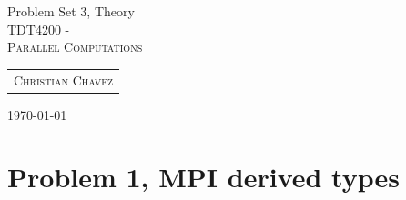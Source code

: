 \documentclass[fontsize=11pt, paper=a4, titlepage]{article}
\begin{document}
\begin{center}

{\huge Problem Set 3, Theory}\\[0.5cm]

\textsc{\LARGE TDT4200 -}\\[0.5cm]
\textsc{\large Parallel Computations}\\[1.0cm]

\begin{table}[h]
    \centering
    \begin{tabular}{c}
        \textsc{Christian Chavez}
    \end{tabular}
\end{table}

\end{center}
\vfill
\hfill \large{\today}
\clearpage

\section{Problem 1, MPI derived types}
\end{document}
